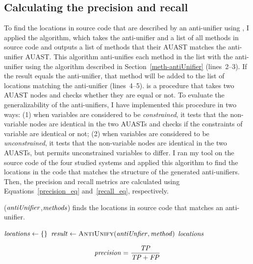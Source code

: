 \subsection{{Calculating the precision and recall}}  \label{precision}
To find the locations in source code that are described by an anti-unifier using , I applied the  algorithm, which takes the anti-unifier and a list of all methods in source code and outputs a list of methods that their AUAST matches the anti-unifier AUAST. This algorithm anti-unifies each method in the list with the anti-unifier using the  algorithm described in Section~\ref{meth-antiUnifier} (lines~2--3). If the result equals the anti-unifier, that method will be added to the list of locations matching the anti-unifier (lines~4--5).  is a procedure that takes two AUAST nodes and checks whether they are equal or not. To evaluate the generalizability of the anti-unifiers, I have implemented this procedure in two ways: (1) when variables are considered to be \emph{constrained}, it tests that the non-variable nodes are identical in the two AUASTs and checks if the constraints of variable are identical or not; (2) when variables are considered to be \emph{unconstrained}, it tests that the non-variable nodes are identical in the two AUASTs, but permits unconstrained variables to differ. I ran my tool on the source code of the four studied systems and applied this algorithm to find the locations in the code that matches the structure of the generated anti-unifiers. Then, the precision and recall metrics are calculated using Equations~\ref{precision_eq} and~\ref{recall_eq}, respectively.


\begin{algorithm}
\caption{($\mathit{antiUnifier}$,$\mathit{methods}$) finds the locations in source code that matches an anti-unifier.}
\label{alg-determine-locations}
\begin{algorithmic}[1]
\DetermineLocations
    \State $\mathit{locations} \gets \{\}$
    \State $\mathit{result} \gets  \textsc{AntiUnify}(\mathit{antiUnfier}, \mathit{method})$
		\EndIf 		
		\EndFor
 \Return $\mathit{locations} $  	
  \end{algorithmic}
\end{algorithm}

\begin{equation}\label{precision_eq}
\mathit{precision} = \frac{\mathit{TP}}{{\mathit{TP}+\mathit{FP}}}
\end{equation}


